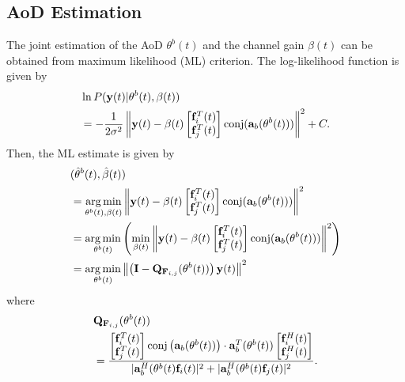 \documentclass[conference]{IEEEtran}
\begin{document}
\subsection{AoD Estimation}

The joint estimation of  the AoD $\theta^{b}(t)$ and the channel gain $\beta(t)$ can be obtained from maximum likelihood (ML) criterion. The log-likelihood function is given by
\begin{align}
 &\ln P(\mathbf{y}(t)|\theta^{b}(t), \beta(t))  \nonumber \\
 & =-\frac{1}{2\sigma^2}\left\| \mathbf{y}(t)- \beta(t)  \begin{bmatrix}\mathbf{f}_{i}^{T}(t) \\
 \mathbf{f}_{j}^{T}(t)  \end{bmatrix} {\rm conj}( \mathbf{a}_{b}(\theta^{b}(t)))\right\|^2 + C. \nonumber \\
\end{align}
Then, the ML estimate is given by
\begin{align}
& (\hat{\theta}^{b}(t), \hat{\beta}(t)) \nonumber \\
& = \underset{{\theta^{b}(t), \beta(t)}}{\arg\min}\left\| \mathbf{y}(t)- \beta(t)  \begin{bmatrix}\mathbf{f}_{i}^{T}(t) \\
\mathbf{f}_{j}^{T}(t)  \end{bmatrix} {\rm conj}( \mathbf{a}_{b}(\theta^{b}(t)))\right\|^2 \nonumber \\
& = \underset{\theta^{b}(t)}{\arg\min} \left( \underset{\beta(t)}{\min} \left\| \mathbf{y}(t)- \beta(t)  \begin{bmatrix}\mathbf{f}_{i}^{T}(t) \\
\mathbf{f}_{j}^{T}(t)  \end{bmatrix} {\rm conj}( \mathbf{a}_{b}(\theta^{b}(t)))\right\|^2\right) \nonumber \\
& = \underset{\theta^{b}(t)}{\arg\min} \left\| \left(\mathbf{I}- \mathbf{Q}_{\mathbf{F}_{i,j}}(\theta^{b}(t)) \right)\mathbf{y}(t) \right\|^2 \label{eq:opt}
\end{align}
where
\begin{align}
 &\mathbf{Q}_{\mathbf{F}_{i,j}}(\theta^{b}(t)) \nonumber \\
 &= \frac{\begin{bmatrix}\mathbf{f}_i^{T}(t) \\ \mathbf{f}_j^{T}(t) \end{bmatrix} {\rm conj}\left( \mathbf{a}_{b}(\theta^{b}(t)) \right) \cdot  \mathbf{a}_{b}^{T}(\theta^{b}(t))
 \begin{bmatrix}\mathbf{f}_i^{H}(t) \\ \mathbf{f}_j^{H}(t) \end{bmatrix}}{|\mathbf{a}_{b}^{H}(\theta^{b}(t)\mathbf{f}_i(t)|^2 + |\mathbf{a}_{b}^{H}(\theta^{b}(t)\mathbf{f}_j(t)|^2}.
\end{align}
\end{document}
